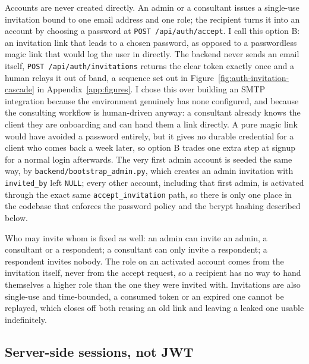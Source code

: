 Accounts are never created directly. An admin or a consultant issues a single-use invitation bound to one email address and one role; the recipient turns it into an account by choosing a password at \texttt{POST /\allowbreak api/\allowbreak auth/\allowbreak accept}. I call this option B: an invitation link that leads to a chosen password, as opposed to a passwordless magic link that would log the user in directly. The backend never sends an email itself, \texttt{POST /\allowbreak api/\allowbreak auth/\allowbreak invitations} returns the clear token exactly once and a human relays it out of band, a sequence set out in Figure~\ref{fig:auth-invitation-cascade} in Appendix~\ref{app:figures}. I chose this over building an SMTP integration because the environment genuinely has none configured, and because the consulting workflow is human-driven anyway: a consultant already knows the client they are onboarding and can hand them a link directly. A pure magic link would have avoided a password entirely, but it gives no durable credential for a client who comes back a week later, so option B trades one extra step at signup for a normal login afterwards. The very first admin account is seeded the same way, by \texttt{backend/\allowbreak bootstrap\_\allowbreak admin.\allowbreak py}, which creates an admin invitation with \texttt{invited\_\allowbreak by} left \texttt{NULL}; every other account, including that first admin, is activated through the exact same \texttt{accept\_\allowbreak invitation} path, so there is only one place in the codebase that enforces the password policy and the bcrypt hashing described below.

Who may invite whom is fixed as well: an admin can invite an admin, a consultant or a respondent; a consultant can only invite a respondent; a respondent invites nobody. The role on an activated account comes from the invitation itself, never from the accept request, so a recipient has no way to hand themselves a higher role than the one they were invited with. Invitations are also single-use and time-bounded, a consumed token or an expired one cannot be replayed, which closes off both reusing an old link and leaving a leaked one usable indefinitely.

\subsection{Server-side sessions, not JWT}

